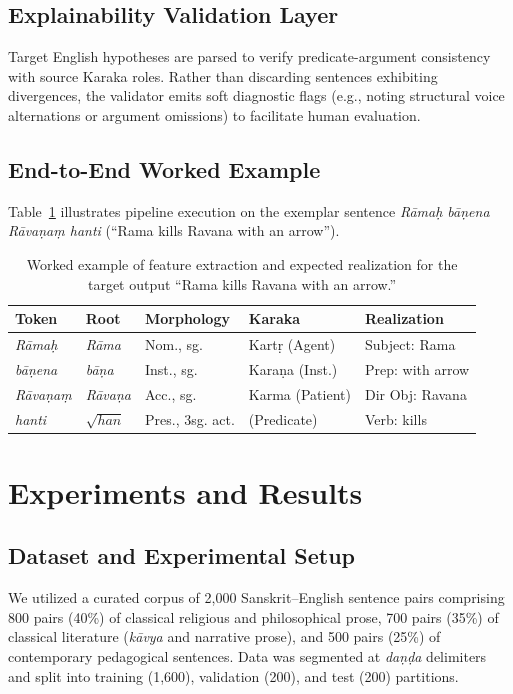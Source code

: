\documentclass[11pt]{article}
\begin{document}
\subsection{Explainability Validation Layer}
Target English hypotheses are parsed to verify predicate-argument consistency with source Karaka roles. Rather than discarding sentences exhibiting divergences, the validator emits soft diagnostic flags (e.g., noting structural voice alternations or argument omissions) to facilitate human evaluation.

\subsection{End-to-End Worked Example}
Table~\ref{tab:worked_example} illustrates pipeline execution on the exemplar sentence \textit{R\=ama\d{h} b\=a\d{n}ena R\=ava\d{n}a\d{m} hanti} (``Rama kills Ravana with an arrow'').

\begin{table}[t]
\centering
\footnotesize
\setlength{\tabcolsep}{3pt}
\begin{tabular}{lllll}
\toprule
\textbf{Token} & \textbf{Root} & \textbf{Morphology} & \textbf{Karaka} & \textbf{Realization} \\
\midrule
\textit{R\=ama\d{h}} & \textit{R\=ama} & Nom., sg. & Kart\d{r} (Agent) & Subject: Rama \\
\textit{b\=a\d{n}ena} & \textit{b\=a\d{n}a} & Inst., sg. & Kara\d{n}a (Inst.) & Prep: with arrow \\
\textit{R\=ava\d{n}a\d{m}} & \textit{R\=ava\d{n}a} & Acc., sg. & Karma (Patient) & Dir Obj: Ravana \\
\textit{hanti} & $\sqrt{han}$ & Pres., 3sg. act. & (Predicate) & Verb: kills \\
\bottomrule
\end{tabular}
\caption{Worked example of feature extraction and expected realization for the target output ``Rama kills Ravana with an arrow.''}
\label{tab:worked_example}
\end{table}

\section{Experiments and Results}

\subsection{Dataset and Experimental Setup}
We utilized a curated corpus of 2,000 Sanskrit--English sentence pairs comprising 800 pairs (40\%) of classical religious and philosophical prose, 700 pairs (35\%) of classical literature (\textit{k\=avya} and narrative prose), and 500 pairs (25\%) of contemporary pedagogical sentences. Data was segmented at \textit{da\d{n}\d{d}a} delimiters and split into training (1,600), validation (200), and test (200) partitions.
\end{document}
